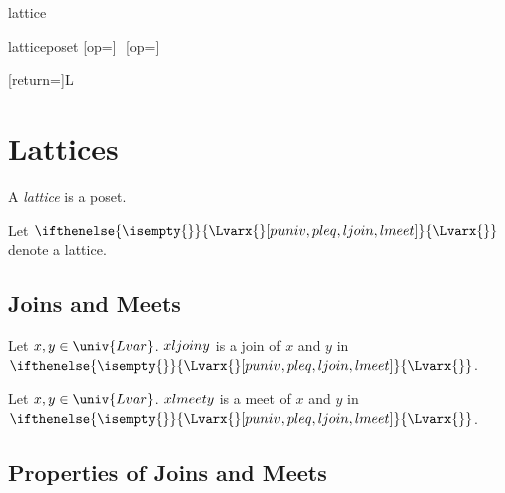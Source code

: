 \documentclass{stex}
\begin{document}
\begin{smodule}{lattice}


  \begin{extstructure}{lattice}{poset}
    [op=\vee]{\,\vee\,}
    [op=\wedge]{\,\wedge\,}
  \end{extstructure}

  [return={\lattice[comp=##1]}]{\mathcal L}
  \newcommand\Lvar[1]{\ifthenelse{\isempty{#1}}{\Lvarx{}[puniv,pleq,ljoin,lmeet]}{\Lvarx{#1}}}

  \section{Lattices}

  \begin{forthel}
  \end{forthel}
  
  \begin{forthel}
    \begin{signature}
      A \emph{lattice} is a poset.
    \end{signature}

    Let $\Lvar{}$ denote a lattice.
  \end{forthel}
  
  \subsection{Joins and Meets}
  
  \begin{forthel}
    \begin{signature}
      Let $x, y \in \univ{Lvar}$.
      $x \join{Lvar} y$ is a join of $x$ and $y$ in $\Lvar{}$.
    \end{signature}

    \begin{signature}
      Let $x, y \in \univ{Lvar}$.
      $x \meet{Lvar} y$ is a meet of $x$ and $y$ in $\Lvar{}$.
    \end{signature}
  \end{forthel}

  \subsection{Properties of Joins and Meets}


\end{smodule}
\end{document}
